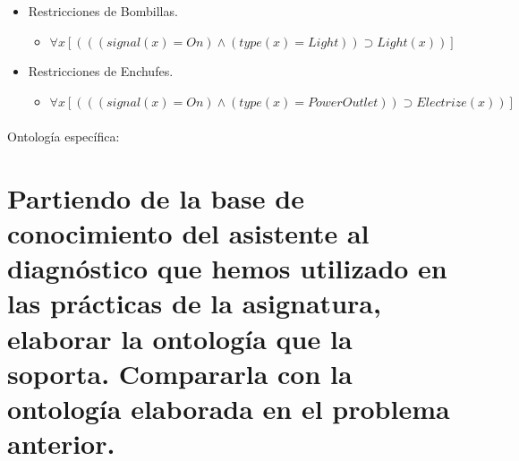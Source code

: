 \documentclass[10pt, a4paper,spanish]{article}
\begin{document}
\begin{itemize}
			\item Restricciones de Bombillas.
			\begin{itemize}
				\item$ \forall x [(((signal(x) = On) \land (type(x) = Light) )  \supset Light(x))] $
			\end{itemize}

			\item Restricciones de Enchufes.
			\begin{itemize}
				\item$ \forall x [(((signal(x) = On) \land (type(x) = PowerOutlet) )  \supset Electrize(x))] $
			\end{itemize}
		\end{itemize}




		\paragraph{}
		Ontología específica:



	\section{Partiendo de la base de conocimiento del asistente al diagnóstico que hemos utilizado en las prácticas de la asignatura, elaborar la ontología que la soporta. Compararla con la ontología elaborada en el problema anterior.}

		\paragraph{}
\end{document}
